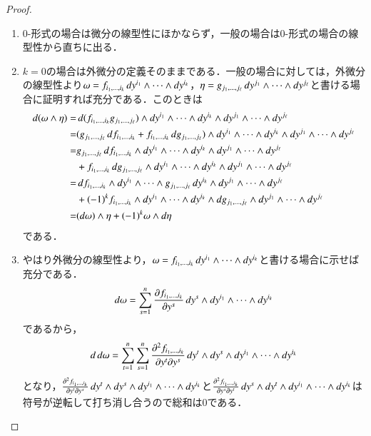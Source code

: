 \begin{proof}
\leavevmode
\begin{enumerate}
\item 0-形式の場合は微分の線型性にほかならず，一般の場合は0-形式の場合の線型性から直ちに出る．
\item $k=0$の場合は外微分の定義そのままである．一般の場合に対しては，外微分の線型性より$\omega = f_{i_1, \dots, i_k} \mathop{}\!d y^{i_1} \wedge \dots \wedge \mathop{}\!d y^{i_k}$，$\eta = g_{j_1, \dots, j_\ell} \mathop{}\!d y^{j_1} \wedge \dots \wedge \mathop{}\!d y^{j_\ell}$と書ける場合に証明すれば充分である．このときは
\begin{align}
\dif (\omega \wedge \eta) 
=& \dif (f_{i_1, \dots, i_k} g_{j_1, \dots, j_\ell}) \wedge \dif y^{i_1} \wedge \dots \wedge \dif y^{i_k} \wedge \dif y^{j_1} \wedge \dots \wedge \dif y^{j_\ell} \\
=& (g_{j_1, \dots, j_\ell} \dif f_{i_1, \dots, i_k} + f_{i_1, \dots, i_k}\dif g_{j_1, \dots, j_\ell} ) \wedge \dif y^{i_1} \wedge \dots \wedge \dif y^{i_k} \wedge \dif y^{j_1} \wedge \dots \wedge \dif y^{j_\ell} \\
=& g_{j_1, \dots, j_\ell} \dif f_{i_1, \dots, i_k}  \wedge \dif y^{i_1} \wedge \dots \wedge \dif y^{i_k} \wedge \dif y^{j_1} \wedge \dots \wedge \dif y^{j_\ell} \\
&+ f_{i_1, \dots, i_k}\dif g_{j_1, \dots, j_\ell} \wedge \dif y^{i_1} \wedge \dots \wedge \dif y^{i_k} \wedge \dif y^{j_1} \wedge \dots \wedge \dif y^{j_\ell} \\
=& \dif f_{i_1, \dots, i_k}  \wedge \dif y^{i_1} \wedge \dots \wedge g_{j_1, \dots, j_\ell} \dif y^{i_k} \wedge \dif y^{j_1} \wedge \dots \wedge \dif y^{j_\ell} \\
&+ (-1)^k f_{i_1, \dots, i_k} \wedge \dif y^{i_1} \wedge \dots \wedge \dif y^{i_k} \wedge \dif g_{j_1, \dots, j_\ell} \wedge \dif y^{j_1} \wedge \dots \wedge \dif y^{j_\ell} \\
=& (\dif \omega) \wedge \eta + (-1)^k \omega \wedge \dif \eta
\end{align}である．
\item やはり外微分の線型性より，$\omega = f_{i_1, \dots, i_k} \mathop{}\!d y^{i_1} \wedge \dots \wedge \mathop{}\!d y^{i_k}$と書ける場合に示せば充分である．
\begin{align}
\mathop{}\!d \omega = \sum_{s=1}^n \frac{\partial f_{i_1, \dots, i_k}}{\partial y^s} \mathop{}\!d y^s \wedge \mathop{}\!d y^{i_1} \wedge \dots \wedge \mathop{}\!d y^{i_k}
\end{align}であるから，
\begin{align}
\mathop{}\!d \mathop{}\!d \omega = \sum_{t=1}^n \sum_{s=1}^n \frac{\partial^2 f_{i_1, \dots, i_k}}{\partial y^t\partial y^s} \mathop{}\!d y^t \wedge \mathop{}\!d y^s \wedge \mathop{}\!d y^{i_1} \wedge \dots \wedge \mathop{}\!d y^{i_k}
\end{align}となり，$\frac{\partial^2 f_{i_1, \dots, i_k}}{\partial y^t\partial y^s} \mathop{}\!d y^t \wedge \mathop{}\!d y^s \wedge \mathop{}\!d y^{i_1} \wedge \dots \wedge \mathop{}\!d y^{i_k}$と$\frac{\partial^2 f_{i_1, \dots, i_k}}{\partial y^s\partial y^t} \mathop{}\!d y^s \wedge \mathop{}\!d y^t \wedge \mathop{}\!d y^{i_1} \wedge \dots \wedge \mathop{}\!d y^{i_k}$は符号が逆転して打ち消し合うので総和は0である．
\end{enumerate}
\end{proof}

